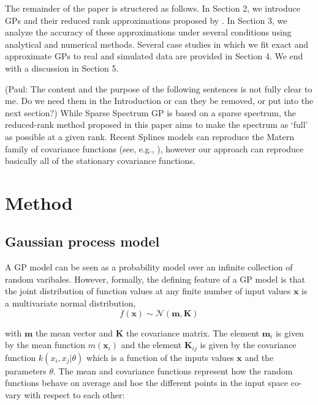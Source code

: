 \documentclass[]{interact}
\theoremstyle{plain}%
\theoremstyle{definition}
\theoremstyle{remark}
\begin{document}
The remainder of the paper is structered as follows. In Section 2, we introduce GPs and their reduced rank approximations proposed by \cite{solin2018hilbert}. In Section 3, we analyze the accuracy of these approximations under several conditions using analytical and numerical methods. Several case studies in which we fit
exact and approximate GPs to real and simulated data are provided in Section 4. We end with a discussion in Section 5.

(Paul: The content and the purpose of the following sentences is not fully clear to me. Do we need them in the Introduction or can they be removed, or put into the next section?) While Sparse Spectrum GP is based on a sparse spectrum, the reduced-rank method proposed in this paper aims to make the spectrum as ‘full’ as possible at a given rank. Recent Splines models can reproduce the Matern family of covariance functions (see, e.g., \cite{wood2003thin}), however our approach can reproduce basically all of the stationary covariance functions.

\vspace{3mm}
\section{Method}\label{sec:bf_method}

\subsection{Gaussian process model}

A GP model can be seen as a probability model over an infinite collection of random varibales. However, formally, the defining feature of a GP model is that the joint distribution of function values at any finite number of input values $\mathbf{x}$ is a multivariate normal distribution, 
%
\begin{equation}
f(\mathbf{x}) \sim \mathcal{N}(\mathbf{m},\mathbf{K})
\end{equation}

\noindent with $\mathbf{m}$ the mean vector and $\mathbf{K}$ the covariance matrix. The element $\mathbf{m}_i$ is given by the mean function $m(\mathbf{x}_i)$ and the element $\mathbf{K}_{ij}$ is given by the covariance function $k(x_i,x_j|\theta)$ which is a function of the inputs values $\mathbf{x}$ and the parameters $\theta$. The mean and covariance functions represent how the random functions behave on average and hoe the different points in the input space co-vary with respect to each other:
\end{document}
